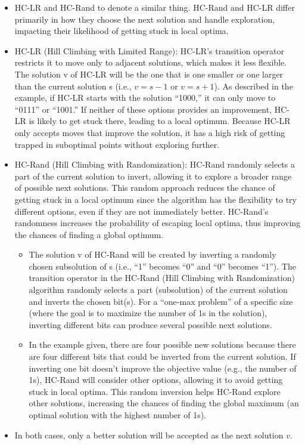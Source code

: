 \documentclass[
  letterpaper,
  DIV=11,
  numbers=noendperiod]{scrreprt}
\providecommand{\tightlist}{%
  \setlength{\itemsep}{0pt}\setlength{\parskip}{0pt}}\usepackage{longtable,booktabs,array}
\begin{document}
\begin{itemize}
\tightlist
\item
  HC-LR and HC-Rand to denote a similar thing. HC-Rand and HC-LR differ
  primarily in how they choose the next solution and handle exploration,
  impacting their likelihood of getting stuck in local optima.
\item
  HC-LR (Hill Climbing with Limited Range): HC-LR's transition operator
  restricts it to move only to adjacent solutions, which makes it less
  flexible. The solution v of HC-LR will be the one that is one smaller
  or one larger than the current solution s (i.e., \(v=s−1\) or
  \(v=s+1\)). As described in the example, if HC-LR starts with the
  solution ``1000,'' it can only move to ``0111'' or ``1001.'' If
  neither of these options provides an improvement, HC-LR is likely to
  get stuck there, leading to a local optimum. Because HC-LR only
  accepts moves that improve the solution, it has a high risk of getting
  trapped in suboptimal points without exploring further.
\item
  HC-Rand (Hill Climbing with Randomization): HC-Rand randomly selects a
  part of the current solution to invert, allowing it to explore a
  broader range of possible next solutions. This random approach reduces
  the chance of getting stuck in a local optimum since the algorithm has
  the flexibility to try different options, even if they are not
  immediately better. HC-Rand's randomness increases the probability of
  escaping local optima, thus improving the chances of finding a global
  optimum.

  \begin{itemize}
  \tightlist
  \item
    The solution v of HC-Rand will be created by inverting a randomly
    chosen subsolution of s (i.e., ``1'' becomes ``0'' and ``0'' becomes
    ``1''). The transition operator in the HC-Rand (Hill Climbing with
    Randomization) algorithm randomly selects a part (subsolution) of
    the current solution and inverts the chosen bit(s). For a ``one-max
    problem'' of a specific size (where the goal is to maximize the
    number of 1s in the solution), inverting different bits can produce
    several possible next solutions.
  \item
    In the example given, there are four possible new solutions because
    there are four different bits that could be inverted from the
    current solution. If inverting one bit doesn't improve the objective
    value (e.g., the number of 1s), HC-Rand will consider other options,
    allowing it to avoid getting stuck in local optima. This random
    inversion helps HC-Rand explore other solutions, increasing the
    chances of finding the global maximum (an optimal solution with the
    highest number of 1s).
  \end{itemize}
\item
  In both cases, only a better solution will be accepted as the next
  solution \(v\).
\end{itemize}
\end{document}
